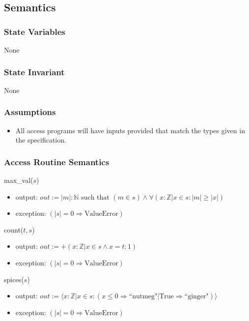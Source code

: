 \documentclass[12pt,fleqn]{examtst}
\begin{document}
\subsection* {Semantics}

\subsubsection* {State Variables}

None

\subsubsection* {State Invariant}

None

\subsubsection* {Assumptions}

\begin{itemize}
\item All access programs will have inputs provided that match the types
  given in the specification.
\end{itemize}

\subsubsection* {Access Routine Semantics}

\noindent max\_val($s$)
\begin{itemize}
\item output: $\mathit{out} := | m |: \mathbb{N} \text{ such that } (m \in s) \wedge
  \forall (x: \mathbb{Z} | x \in s : | m | \geq | x |)$
\item exception: $(|s| = 0 \Rightarrow \text{ValueError})$
\end{itemize}

\noindent count($t, s$)
\begin{itemize}
\item output: $\mathit{out} := + (x: \mathbb{Z} | x \in s \wedge x = t : 1)$
\item exception: $(|s| = 0 \Rightarrow \text{ValueError})$
\end{itemize}

\noindent spices($s$)
\begin{itemize}
\item output: $\mathit{out} := \langle x: \mathbb{Z} | x \in s : (x \leq 0
  \Rightarrow \text{``nutmeg"} | \text{True} \Rightarrow \text{``ginger"}) \rangle$
\item exception: $(|s| = 0 \Rightarrow \text{ValueError})$
\end{itemize}
\end{document}
